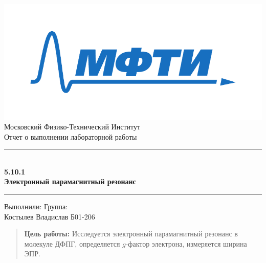 \documentclass[a4paper, 12pt]{article}
\begin{document}

\begin{titlepage}
    \vspace*{\fill}
    
    \begin{center}
        \includegraphics[scale=0.8]{res/MIPT.pdf}
        \\[0.7cm]\Huge Московский Физико-Технический Институт
        \\[2cm]\LARGE Отчет о выполнении лабораторной работы 
        \\[0.5cm]\noindent\rule{\textwidth}{1pt}
        \\\Huge\textbf{5.10.1 \\ Электронный парамагнитный резонанс}
        \\[-0.5cm]\noindent\rule{\textwidth}{1pt}
    \end{center}
    
    \vspace*{\fill}
    
    \begin{flushleft}
        Выполнили: \hspace{\fill} Группа:
        \\Костылев Владислав\hspace{\fill} Б01-206
    \end{flushleft}
\end{titlepage}

\setcounter{page}{2}


\begin{abstract}
    \textbf{Цель работы:} Исследуется электронный парамагнитный резонанс в молекуле ДФПГ, определяется $g$-фактор электрона, измеряется ширина ЭПР. 
\end{abstract}
\end{document}
